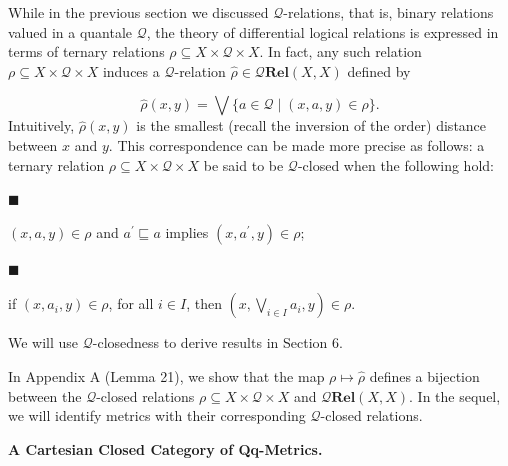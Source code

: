 While in the previous section we discussed $\mathcal{Q}$-relations, that is, binary relations valued in a quantale $\mathcal{Q}$, the theory of differential logical relations is expressed in terms of ternary relations $\rho\subseteq X\times\mathcal{Q}\times X$. In fact, any such relation $\rho\subseteq X\times\mathcal{Q}\times X$ induces a $\mathcal{Q}$-relation $\widehat{\rho}\in\mathcal{Q}\mathbf{Rel}(X,X)$ defined by\par
    \[\widehat{\rho}(x,y)=\bigvee\{a\in\mathcal{Q}\mid(x,a,y)\in\rho\}.\]    
Intuitively, $\widehat{\rho}(x,y)$ is the smallest (recall the inversion of the order) distance between $x$ and $y$. This correspondence can be made more precise as follows: a ternary relation $\rho\subseteq X\times\mathcal{Q}\times X$ be said to be $\mathcal{Q}$-closed when the following hold:\par
  
\par\noindent  $\blacksquare$ 
 
$(x,a,y)\in\rho$ and $a^{\prime}\sqsubseteq a$ implies $(x,a^{\prime},y)\in\rho$;\par
 
 
 
\par\noindent  $\blacksquare$ 
 
if $(x,a_{i},y)\in\rho$, for all $i\in I$, then $(x,\bigvee_{i\in I}a_{i},y)\in\rho$.\par
 
 
  
We will use $\mathcal{Q}$-closedness to derive results in Section 6.\par
 
 
 
In Appendix A (Lemma 21), we show that the map $\rho\mapsto\widehat{\rho}$ defines a bijection between the $\mathcal{Q}$-closed relations $\rho\subseteq X\times\mathcal{Q}\times X$ and $\mathcal{Q}\mathbf{Rel}(X,X)$. In the sequel, we will identify metrics with their corresponding $\mathcal{Q}$-closed relations.\par
 
 
 
 
\par\medskip\noindent\textbf{A Cartesian Closed Category of Qq-Metrics.}\par
 
